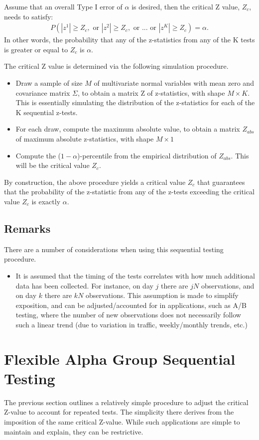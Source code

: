 \documentclass[final,3p,times]{elsarticle}
\begin{document}
Assume that an overall Type I error of $\alpha$ is desired, then the critical Z value, $Z_c$, needs to satisfy:
\begin{align*}
P(|z^1| \geq Z_c, \mbox{ or } |z^2| \geq Z_c, \mbox{ or } ... \mbox{ or }|z^K| \geq Z_c) = \alpha.
\end{align*}
In other words, the probability that any of the z-statistics from any of the K tests is greater or equal to $Z_c$ is $\alpha$.

The critical Z value is determined via the following simulation procedure.
\begin{itemize}
\item Draw a sample of size $M$ of multivariate normal variables with mean zero and covariance matrix $\Sigma$, to obtain a matrix Z of z-statistics, with shape $M\times K$. This is essentially simulating the distribution of the z-statistics for each of the K sequential z-tests.
\item For each draw, compute the maximum absolute value, to obtain a matrix $Z_{abs}$ of maximum absolute z-statistics, with shape  $M\times 1$
\item Compute the ($1-\alpha$)-percentile from the empirical distribution of $Z_{abs}$. This will be the critical value $Z_c$.
\end{itemize}

By construction, the above procedure yields a critical value $Z_c$ that guarantees that the probability of the z-statistic from any of the z-tests exceeding the critical value $Z_c$ is exactly $\alpha$.

\subsection{Remarks}
There are a number of considerations when using this sequential testing procedure.

\begin{itemize}
\item It is assumed that the timing of the tests correlates with how much additional data has been collected. For instance, on day $j$ there are $jN$ observations, and on day $k$ there are $kN$ observations. This assumption is made to simplify exposition, and can be adjusted/accounted for in applications, such as A/B testing, where the number of new observations does not necessarily follow such a linear trend (due to variation in traffic, weekly/monthly trends, etc.)
\end{itemize}

\section{Flexible Alpha Group Sequential Testing}
The previous section outlines a relatively simple procedure to adjust the critical Z-value to account for repeated tests. The simplicity there derives from the imposition of the same critical Z-value. While such applications are simple to maintain and explain, they can be restrictive.
\end{document}
